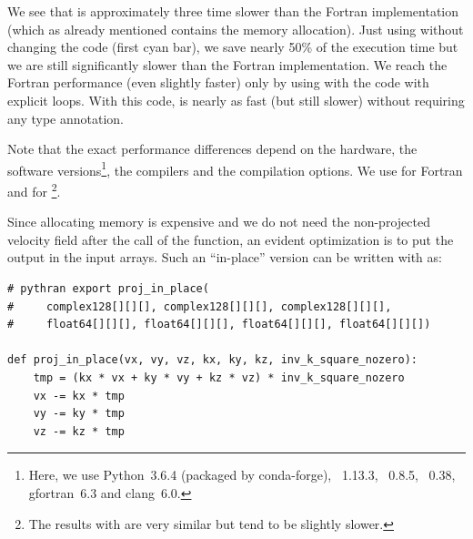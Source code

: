 \documentclass{../jors}
\begin{document}
We see that  is approximately three time slower than the Fortran
implementation (which as already mentioned contains the memory allocation).
%
Just using  without changing the code (first cyan bar), we save
nearly 50\% of the execution time but we are still significantly slower than
the Fortran implementation.
%
We reach the Fortran performance (even slightly faster) only by using
 with the code with explicit loops.
%
With this code,  is nearly as fast (but still slower) without
requiring any type annotation.

Note that the exact performance differences depend on the hardware, the software
versions\footnote{Here, we use Python~3.6.4 (packaged by conda-forge),
~1.13.3, ~0.8.5, ~0.38, gfortran~6.3 and
clang~6.0.}, the compilers and the compilation options.
%
We use  for Fortran and
 for \footnote{The results
with  are very similar but tend to be slightly
slower.}.
%


Since allocating memory is expensive and we do not need the non-projected
velocity field after the call of the function, an evident optimization is to
put the output in the input arrays.  Such an ``in-place'' version can be written
with  as:
\begin{verbatim}
# pythran export proj_in_place(
#     complex128[][][], complex128[][][], complex128[][][],
#     float64[][][], float64[][][], float64[][][], float64[][][])

def proj_in_place(vx, vy, vz, kx, ky, kz, inv_k_square_nozero):
    tmp = (kx * vx + ky * vy + kz * vz) * inv_k_square_nozero
    vx -= kx * tmp
    vy -= ky * tmp
    vz -= kz * tmp
\end{verbatim}
\end{document}
